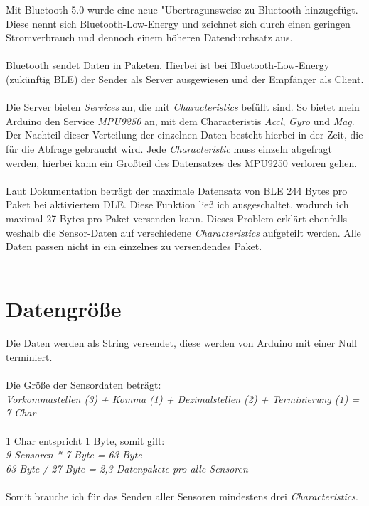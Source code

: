 Mit Bluetooth 5.0 wurde eine neue "Ubertragunsweise zu 
Bluetooth hinzugefügt. Diese nennt sich Bluetooth-Low-Energy und zeichnet
sich durch einen geringen Stromverbrauch und dennoch einem höheren 
Datendurchsatz aus. \\
\\
Bluetooth sendet Daten in Paketen. Hierbei ist bei Bluetooth-Low-Energy
(zukünftig BLE) der Sender als Server ausgewiesen und der Empfänger als Client.\\
\\
Die Server bieten \textit{Services} an, die mit \textit{Characteristics} befüllt sind.
So bietet mein Arduino den Service \textit{MPU9250} an, mit dem Characteristis \textit{Accl}, \textit{Gyro}
und \textit{Mag}.\\
Der Nachteil dieser Verteilung der einzelnen Daten besteht hierbei in der Zeit, die für die
Abfrage gebraucht wird. Jede \textit{Characteristic} muss einzeln abgefragt werden, hierbei kann ein
Großteil des Datensatzes des MPU9250 verloren gehen.\\
\\
Laut Dokumentation beträgt der maximale Datensatz von BLE 244 Bytes pro Paket bei 
aktiviertem DLE. Diese Funktion ließ ich ausgeschaltet, wodurch ich maximal
27 Bytes pro Paket versenden kann. Dieses Problem erklärt ebenfalls weshalb die Sensor-Daten
auf verschiedene \textit{Characteristics} aufgeteilt werden. Alle Daten passen nicht in ein einzelnes
zu versendendes Paket. \\
\\

\section{Datengröße}
Die Daten werden als String versendet, diese werden von Arduino mit einer
Null terminiert. \\
\\
Die Größe der Sensordaten beträgt:\\
\textit{Vorkommastellen (3) + Komma (1) + Dezimalstellen (2) + Terminierung (1) = 7 Char}\\
\\
1 Char entspricht 1 Byte, somit gilt:\\
\textit{
9 Sensoren * 7 Byte = 63 Byte \\
63 Byte / 27 Byte = 2,3 Datenpakete pro alle Sensoren
}\\
\\
Somit brauche ich für das Senden aller Sensoren mindestens drei \textit{Characteristics}.


